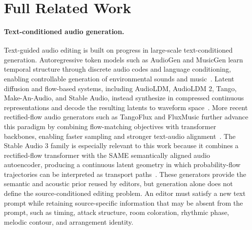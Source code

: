 \newpage
\appendix
\setcounter{secnumdepth}{1}

\section{Full Related Work}
\label{app:full_related_work}

\paragraph{Text-conditioned audio generation.}
Text-guided audio editing is built on progress in large-scale text-conditioned generation.
Autoregressive token models such as AudioGen and MusicGen learn temporal structure through discrete audio codes and language conditioning, enabling controllable generation of environmental sounds and music~\cite{kreuk2023audiogentextuallyguidedaudio,copet2024simplecontrollablemusicgeneration}.
Latent diffusion and flow-based systems, including AudioLDM, AudioLDM 2, Tango, Make-An-Audio, and Stable Audio, instead synthesize in compressed continuous representations and decode the resulting latents to waveform space~\cite{liu2023audioldmtexttoaudiogenerationlatent,liu2023audioldm2,ghosal2023texttoaudiogenerationusinginstructiontuned,huang2023makeanaudio,evans2026stableaudio3}.
More recent rectified-flow audio generators such as TangoFlux and FluxMusic further advance this paradigm by combining flow-matching objectives with transformer backbones, enabling faster sampling and stronger text-audio alignment~\cite{hung2024tangoflux,fei2024fluxmusic}.
The Stable Audio 3 family is especially relevant to this work because it combines a rectified-flow transformer with the SAME semantically aligned audio autoencoder, producing a continuous latent geometry in which probability-flow trajectories can be interpreted as transport paths~\cite{evans2026stableaudio3,parker2026samesemanticallyalignedmusicautoencoder}.
These generators provide the semantic and acoustic prior reused by editors, but generation alone does not define the source-conditioned editing problem.
An editor must satisfy a new text prompt while retaining source-specific information that may be absent from the prompt, such as timing, attack structure, room coloration, rhythmic phase, melodic contour, and arrangement identity.

